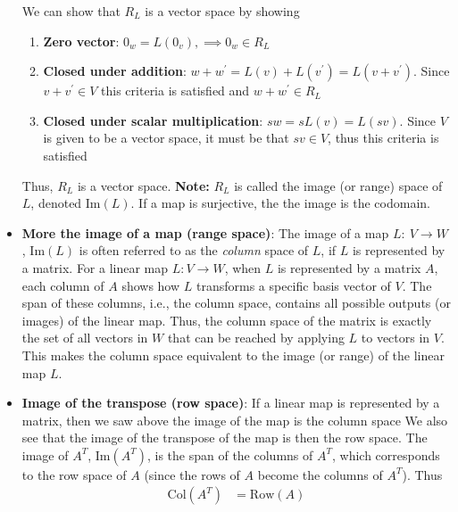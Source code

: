 \documentclass{report}
\begin{document}
\begin{itemize}
            \bigbreak \noindent 
            We can show that $R_{L}$ is a vector space by showing
            \begin{enumerate}
                \item \textbf{Zero vector}: $0_{w} = L(0_{v}), \implies 0_{w} \in R_{L}$
                \item \textbf{Closed under addition}: $w + w^{\prime} = L(v) + L(v^{\prime}) = L(v+v^{\prime})$. Since $v + v^{\prime} \in V$ this criteria is satisfied and $w + w^{\prime} \in R_{L} $
                \item \textbf{Closed under scalar multiplication}: $sw = sL(v) = L(sv)$. Since $V$ is given to be a vector space, it must be that $sv \in V$, thus this criteria is satisfied
            \end{enumerate}
            \bigbreak \noindent 
            Thus, $R_{L}$ is a vector space.
            \bigbreak \noindent 
            \textbf{Note:} $R_{L}$ is called the image (or range) space of $L$, denoted $\text{Im}(L)$.
            \bigbreak \noindent 
            If a map is surjective, the the image is the codomain.
        \item \textbf{More the image of a map (range space)}: The image of a map $L:\ V \to W$, $\text{Im}(L)$ is often referred to as the \textit{column} space of $L$, if $L$ is represented by a matrix.
            \bigbreak \noindent 
            For a linear map \( L: V \to W \), when \( L \) is represented by a matrix \( A \), each column of \( A \) shows how \( L \) transforms a specific basis vector of \( V \). The span of these columns, i.e., the column space, contains all possible outputs (or images) of the linear map.
            \bigbreak \noindent 
            Thus, the column space of the matrix is exactly the set of all vectors in \( W \) that can be reached by applying \( L \) to vectors in \( V \). This makes the column space equivalent to the image (or range) of the linear map \( L \).
        \item \textbf{Image of the transpose (row space)}: If a linear map is represented by a matrix, then we saw above the image of the map is the column space
            \bigbreak \noindent 
            We also see that the image of the transpose of the map is then the row space. The image of $A^T$, $\text{Im}(A^T)$, is the span of the columns of $A^T$, which corresponds to the row space of $A$ (since the rows of $A$ become the columns of $A^T$). Thus
            \begin{align*}
                \text{Col}(A^{T}) &= \text{Row}(A) \\

\end{align*}
\end{itemize}
\end{document}

